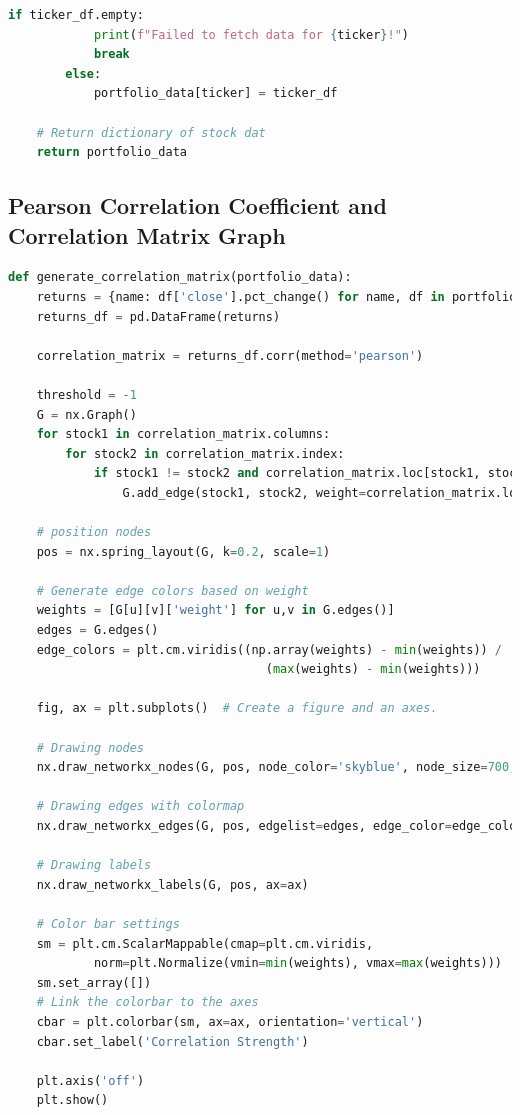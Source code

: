 \documentclass{article}
\begin{document}
\begin{appendices}
\begin{lstlisting}[language=Python]
        if ticker_df.empty:
            print(f"Failed to fetch data for {ticker}!")
            break
        else:
            portfolio_data[ticker] = ticker_df
    
    # Return dictionary of stock dat 
    return portfolio_data
\end{lstlisting}


\subsection{Pearson Correlation Coefficient and Correlation Matrix Graph}

\begin{lstlisting}[language=python]
def generate_correlation_matrix(portfolio_data):
    returns = {name: df['close'].pct_change() for name, df in portfolio_data.items()}
    returns_df = pd.DataFrame(returns)

    correlation_matrix = returns_df.corr(method='pearson')

    threshold = -1
    G = nx.Graph()
    for stock1 in correlation_matrix.columns:
        for stock2 in correlation_matrix.index:
            if stock1 != stock2 and correlation_matrix.loc[stock1, stock2] > threshold:
                G.add_edge(stock1, stock2, weight=correlation_matrix.loc[stock1, stock2])

    # position nodes
    pos = nx.spring_layout(G, k=0.2, scale=1)  

    # Generate edge colors based on weight
    weights = [G[u][v]['weight'] for u,v in G.edges()]
    edges = G.edges()
    edge_colors = plt.cm.viridis((np.array(weights) - min(weights)) / 
                                    (max(weights) - min(weights)))

    fig, ax = plt.subplots()  # Create a figure and an axes.

    # Drawing nodes
    nx.draw_networkx_nodes(G, pos, node_color='skyblue', node_size=700, ax=ax)

    # Drawing edges with colormap
    nx.draw_networkx_edges(G, pos, edgelist=edges, edge_color=edge_colors, ax=ax)

    # Drawing labels
    nx.draw_networkx_labels(G, pos, ax=ax)

    # Color bar settings
    sm = plt.cm.ScalarMappable(cmap=plt.cm.viridis, 
            norm=plt.Normalize(vmin=min(weights), vmax=max(weights)))
    sm.set_array([])
    # Link the colorbar to the axes
    cbar = plt.colorbar(sm, ax=ax, orientation='vertical')  
    cbar.set_label('Correlation Strength')

    plt.axis('off') 
    plt.show() 
\end{lstlisting}
    
\end{appendices}
\end{document}
